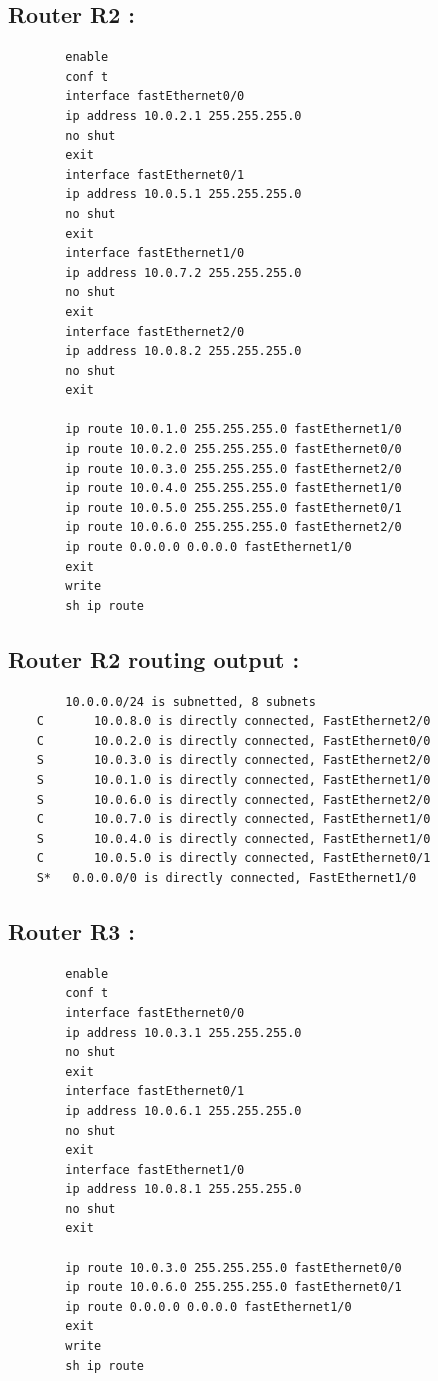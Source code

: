 \documentclass[a4paper,11pt]{article}
\begin{document}
	 	\subsection{Router R2 :}
	 	\label{subsec:routerconf2}
	 	\begin{lstlisting}
	 	enable
	 	conf t
	 	interface fastEthernet0/0
	 	ip address 10.0.2.1 255.255.255.0
	 	no shut
	 	exit
	 	interface fastEthernet0/1
	 	ip address 10.0.5.1 255.255.255.0
	 	no shut
	 	exit
	 	interface fastEthernet1/0
	 	ip address 10.0.7.2 255.255.255.0
	 	no shut
	 	exit
	 	interface fastEthernet2/0
	 	ip address 10.0.8.2 255.255.255.0
	 	no shut
	 	exit

	 	ip route 10.0.1.0 255.255.255.0 fastEthernet1/0
	 	ip route 10.0.2.0 255.255.255.0 fastEthernet0/0
	 	ip route 10.0.3.0 255.255.255.0 fastEthernet2/0
	 	ip route 10.0.4.0 255.255.255.0 fastEthernet1/0
	 	ip route 10.0.5.0 255.255.255.0 fastEthernet0/1
	 	ip route 10.0.6.0 255.255.255.0 fastEthernet2/0
	 	ip route 0.0.0.0 0.0.0.0 fastEthernet1/0
	 	exit
	 	write
	 	sh ip route
	 	\end{lstlisting}

	 	\subsection{Router R2 routing output :}
	 	\label{subsec:routerconfout2}
	 	\begin{lstlisting}
	    10.0.0.0/24 is subnetted, 8 subnets
	C       10.0.8.0 is directly connected, FastEthernet2/0
	C       10.0.2.0 is directly connected, FastEthernet0/0
	S       10.0.3.0 is directly connected, FastEthernet2/0
	S       10.0.1.0 is directly connected, FastEthernet1/0
	S       10.0.6.0 is directly connected, FastEthernet2/0
	C       10.0.7.0 is directly connected, FastEthernet1/0
	S       10.0.4.0 is directly connected, FastEthernet1/0
	C       10.0.5.0 is directly connected, FastEthernet0/1
	S*   0.0.0.0/0 is directly connected, FastEthernet1/0
	 	\end{lstlisting}

	 	\subsection{Router R3 :}
	 	\label{subsec:routerconf3}
	 	\begin{lstlisting}
	 	enable
	 	conf t
	 	interface fastEthernet0/0
	 	ip address 10.0.3.1 255.255.255.0
	 	no shut
	 	exit
	 	interface fastEthernet0/1
	 	ip address 10.0.6.1 255.255.255.0
	 	no shut
	 	exit
	 	interface fastEthernet1/0
	 	ip address 10.0.8.1 255.255.255.0
	 	no shut
	 	exit

	 	ip route 10.0.3.0 255.255.255.0 fastEthernet0/0
	 	ip route 10.0.6.0 255.255.255.0 fastEthernet0/1
	 	ip route 0.0.0.0 0.0.0.0 fastEthernet1/0
	 	exit
	 	write
	 	sh ip route
	 	\end{lstlisting}
\end{document}
